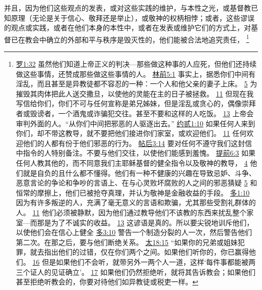 \documentclass[12pt, a4paper, oneside]{ctexart}
\begin{document}
	并且，因为他们这些观点的发表，或对这些实践的维护，与本性之光，或基督教已知原理（无论是关于信心、敬拜还是举止），或敬神的权柄相悖；或者，这些谬误的观点或实践，或者在他们本身的本性中，或者在发表或维护它们的方式上，对基督已在教会中确立的外部和平与秩序是毁灭性的，他们能被合法地追究责任，
	\footnote {
		\href{https://biblehub.com/romans/1-32.htm}{罗1:32} 虽然他们知道上帝正义的判决---那些做这种事的人应死，但他们还持续做这些事情，还赞成那些做这些事情的人。
		\href{https://biblehub.com/1_corinthians/5-1.htm}{林前5:1} 事实上，据悉你们中间有淫乱，而且甚至是异教徒都不容忍的一种：一个人和他父亲的妻子上床。
		\href{https://biblehub.com/1_corinthians/5-5.htm}{5} 为摧毁其肉体把此人送交撒旦，以使他的灵能在主的日子被拯救。
		\href{https://biblehub.com/1_corinthians/5-11.htm}{11} 但现在我写信给你们，你们不可与任何宣称是弟兄姊妹，但是淫乱或贪心的，偶像崇拜者或毁谤者，一个酒鬼或诈骗犯交往。甚至不要和这样的人吃饭。
		\href{https://biblehub.com/1_corinthians/5-13.htm}{13} 上帝会审判外面的人。“从你们中间把邪恶的人驱逐出去。”
		\href{https://biblehub.com/2_john/1-10.htm}{约贰1:10} 如果任何人来到你们，却不带这教导，就不要把他们接进你们家室，或欢迎他们。
		\href{https://biblehub.com/2_john/1-11.htm}{11} 任何欢迎他们的人都有份于他们邪恶的行为。
		\href{https://biblehub.com/2_thessalonians/3-14.htm}{帖后3:14} 要对任何不遵守我们这封信中指令的人特别备注。不要与他们交往，以使他们能感到羞愧。
		\href{https://biblehub.com/1_timothy/6-3.htm}{提前6:3} 如果任何人教其他的，而不同意我们主耶稣基督的健全指令以及敬神的教导，
		\href{https://biblehub.com/1_timothy/6-4.htm}{4} 他们就是自负的且什么都不懂得。他们有一种不健康的兴趣在导致忌妒、斗争、恶意言论的争论和争吵的言语上、在与心灵败坏腐败的人之间的邪恶猜疑
		\href{https://biblehub.com/1_timothy/6-5.htm}{5} 和恒常的摩擦上，他们已被抢夺真理，并认为敬神是金融收益的手段。
		\href{https://biblehub.com/titus/1-10.htm}{多1:10} 因为有许多叛逆的人，充满了毫无意义的言语和欺骗，尤其那些受割礼群体的人。
		\href{https://biblehub.com/titus/1-11.htm}{11} 他们必须被静默，因为他们通过教导他们不该教的东西来扰乱整个家室---而那是为了不诚实的收益。
		\href{https://biblehub.com/titus/1-13.htm}{13} 这谚语是真的。所以要尖锐地训斥他们，以使他们会在信心上健全
		\href{https://biblehub.com/titus/3-10.htm}{多3:10} 警告一个制造分裂的人一次，然后警告他们第二次。在那之后，要与他们断绝关系。
		\href{https://biblehub.com/matthew/18-15.htm}{太18:15} “如果你的兄弟或姐妹犯罪，就去指出他们的过错，仅在你们两个之间。如果他们听你的，你已赢得他们。
		\href{https://biblehub.com/matthew/18-16.htm}{16} 但是如果他们不会听，就带另外一两个人一道，这样‘每件事都能被两三个证人的见证确立’。
		\href{https://biblehub.com/matthew/18-17.htm}{17} 如果他们仍然拒绝听，就将其告诉教会；如果他们甚至拒绝听教会的，你要对待他们如异教徒或税吏一样。
}
\end{document}
